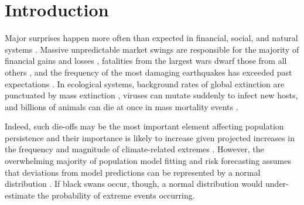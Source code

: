 

\section{Introduction}

Major surprises happen more often than expected in
financial, social, and natural systems \citep{taleb2007, sornette2009, may2008}.
Massive unpredictable market swings are responsible for the majority of
financial gains and losses \citep{taleb2007}, fatalities from the largest wars
dwarf those from all others  \citep{newman2005}, and the frequency of the most
damaging earthquakes has exceeded past expectations \citep{sornette2009}. In
ecological systems, background rates of global extinction are punctuated by
mass extinction \citep{harnik2012}, viruses can mutate suddenly to infect new
hosts, and billions of animals can die at once in mass mortality
events \citep{fey2015}.

Indeed, such die-offs may be the most important element
affecting population persistence \citep{mangel1994} and their importance is
likely to increase given projected increases in the frequency and magnitude of
climate-related extremes \citep{ipcc2012}.
However, the overwhelming majority of population model fitting and risk forecasting
assumes that deviations from model predictions can be represented by a normal
distribution \citep[typically on a log scale; e.g.][]{brook2006a, knape2012}.
If black swans occur, though, a normal distribution would under-estimate the
probability of extreme events occurring.

